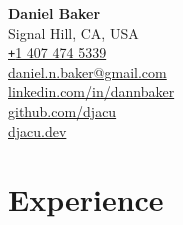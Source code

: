 \documentclass{article}
\begin{document}
\begin{flushleft}
    \textbf{\Huge Daniel Baker} \vspace{0.5em} \\
    Signal Hill, CA, USA \\
    \href{tel:14074745339}{\texttt{+}1 407 474 5339} \\
    \href{mailto:daniel.n.baker@gmail.com}{daniel.n.baker@gmail.com} \\
    \href{https://www.linkedin.com/in/dannbaker/}{linkedin.com/in/dannbaker} \\
    \href{https://github.com/djacu}{github.com/djacu} \\
    \href{https://djacu.dev/}{djacu.dev}
\end{flushleft}

\section{Experience}
\end{document}
